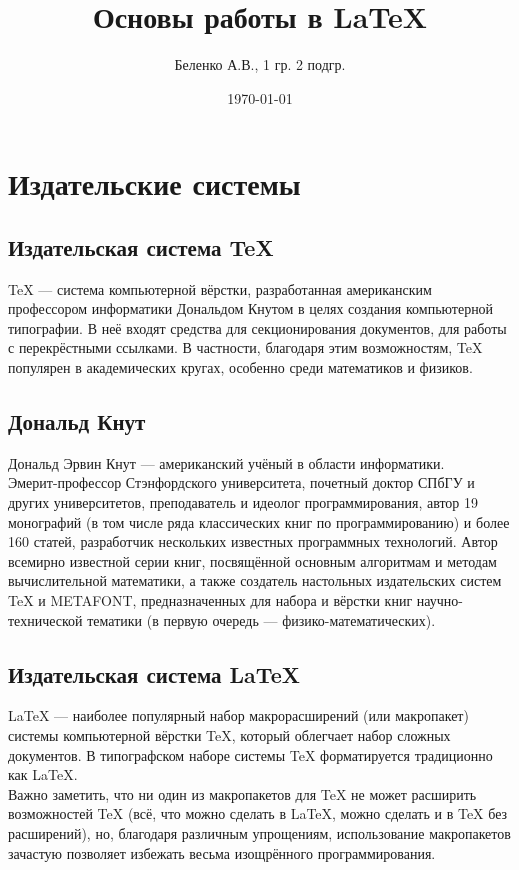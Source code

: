 \documentclass[a4paper,12pt]{article} %
\author{Беленко А.В., 1 гр. 2 подгр.}
\title{Основы работы в \LaTeX{}}
\date{\today}
\begin{document}
\maketitle
\newpage
\section{Издательские системы}
\subsection{Издательская система TeX}
TeX --- система компьютерной вёрстки, разработанная американским профессором информатики Дональдом Кнутом в целях создания компьютерной типографии. В неё входят средства для секционирования документов, для работы с перекрёстными ссылками. В частности, благодаря этим возможностям, TeX популярен в академических кругах, особенно среди математиков и физиков.

\subsection{Дональд Кнут}
Дональд Эрвин Кнут --- американский учёный в области информатики.\\
Эмерит-профессор Стэнфордского университета, почетный доктор СПбГУ и других университетов, преподаватель и идеолог программирования, автор 19 монографий (в том числе ряда классических книг по программированию) и более 160 статей, разработчик нескольких известных программных технологий. Автор всемирно известной серии книг, посвящённой основным алгоритмам и методам вычислительной математики, а также создатель настольных издательских систем TeX и METAFONT, предназначенных для набора и вёрстки книг научно-технической тематики (в первую очередь --- физико-математических).

\subsection{Издательская система LaTeX}
LaTeX --- наиболее популярный набор макрорасширений (или макропакет) системы компьютерной вёрстки TeX, который облегчает набор сложных документов. В типографском наборе системы TeX форматируется традиционно как LaTeX.\\
Важно заметить, что ни один из макропакетов для TeX не может расширить возможностей TeX (всё, что можно сделать в LaTeX, можно сделать и в TeX без расширений), но, благодаря различным упрощениям, использование макропакетов зачастую позволяет избежать весьма изощрённого программирования.
\end{document}
